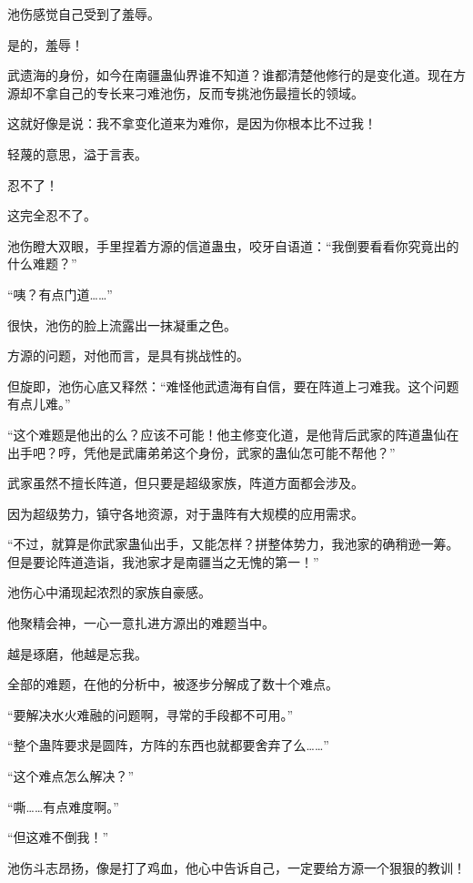 
\begin{this_body}

池伤感觉自己受到了羞辱。

是的，羞辱！

武遗海的身份，如今在南疆蛊仙界谁不知道？谁都清楚他修行的是变化道。现在方源却不拿自己的专长来刁难池伤，反而专挑池伤最擅长的领域。

这就好像是说：我不拿变化道来为难你，是因为你根本比不过我！

轻蔑的意思，溢于言表。

忍不了！

这完全忍不了。

池伤瞪大双眼，手里捏着方源的信道蛊虫，咬牙自语道：“我倒要看看你究竟出的什么难题？”

“咦？有点门道……”

很快，池伤的脸上流露出一抹凝重之色。

方源的问题，对他而言，是具有挑战性的。

但旋即，池伤心底又释然：“难怪他武遗海有自信，要在阵道上刁难我。这个问题有点儿难。”

“这个难题是他出的么？应该不可能！他主修变化道，是他背后武家的阵道蛊仙在出手吧？哼，凭他是武庸弟弟这个身份，武家的蛊仙怎可能不帮他？”

武家虽然不擅长阵道，但只要是超级家族，阵道方面都会涉及。

因为超级势力，镇守各地资源，对于蛊阵有大规模的应用需求。

“不过，就算是你武家蛊仙出手，又能怎样？拼整体势力，我池家的确稍逊一筹。但是要论阵道造诣，我池家才是南疆当之无愧的第一！”

池伤心中涌现起浓烈的家族自豪感。

他聚精会神，一心一意扎进方源出的难题当中。

越是琢磨，他越是忘我。

全部的难题，在他的分析中，被逐步分解成了数十个难点。

“要解决水火难融的问题啊，寻常的手段都不可用。”

“整个蛊阵要求是圆阵，方阵的东西也就都要舍弃了么……”

“这个难点怎么解决？”

“嘶……有点难度啊。”

“但这难不倒我！”

池伤斗志昂扬，像是打了鸡血，他心中告诉自己，一定要给方源一个狠狠的教训！


\end{this_body}
